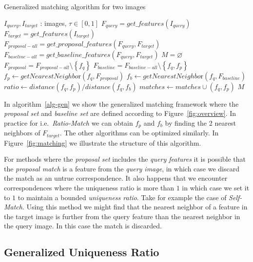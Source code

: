 \documentclass[journal]{IEEEtran}
\begin{document}
\begin{algorithm}[htb]
\caption{Generalized matching algorithm for two images}
\label{alg-gen}
\begin{algorithmic}
    \Require $I_{query}, I_{target}$ : images, $\tau \in [0,1]$
    \State $F_{query} = get\_features(I_{query})$
    \State $F_{target} = get\_features(I_{target})$
\State $F_{proposal-all} = get\_proposal\_features(F_{query}, 
F_{target})$
\State $F_{baseline-all} = get\_baseline\_features(F_{query}, 
F_{target})$
\State $M = \varnothing$
    \State $F_{proposal} = F_{proposal-all} \setminus 
    \left\{f_q\right\}$
    \State $F_{baseline} = F_{baseline-all} \setminus \left\{f_q, 
    f_p\right\}$
    \State $f_p \gets getNearestNeighbo\text{r}(f_q, F_{proposal})$
    \State $f_b \gets getNearestNeighbo\text{r}(f_q, F_{baseline})$
    \State $ratio \gets distance(f_q, f_p) / distance(f_q, f_b)$
        \State $matches \gets matches \cup \left(f_q, f_p\right)$
	\EndIf
\EndFor
\Return $M$
\end{algorithmic}
\end{algorithm}

In algorithm~\ref{alg-gen} we show the generalized matching framework 
where the \emph{proposal set} and \emph{baseline set} are defined 
according to Figure~\ref{fig:overview}.  In practice for i.e.\ 
\emph{Ratio-Match} we can obtain $f_p$ and $f_b$ by finding the 2 
nearest neighbors of $F_{target}$. The other algorithms can be optimized 
similarly. In Figure~\ref{fig:matching} we illustrate the structure of 
this algorithm.

For methods where the \emph{proposal set} includes the \emph{query 
features} it is possible that the \emph{proposal match} is a feature 
from the \emph{query image}, in which case we discard the match as an 
untrue correspondence.  It also happens that we encounter 
correspondences where the uniqueness ratio is more than $1$ in which 
case we set it to $1$ to maintain a bounded \emph{uniqueness ratio}.  
Take for example the case of \emph{Self-Match}. Using this method we 
might find that the nearest neighbor of a feature in the target image is 
further from the query feature than the nearest neighbor in the query 
image. In this case the match is discarded.

%
\subsection{Generalized Uniqueness Ratio}
%
\end{document}
